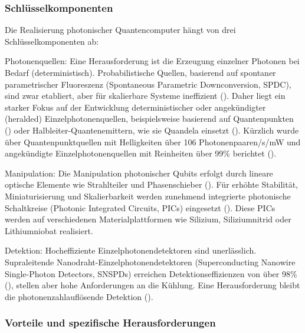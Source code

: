 \subsubsection{Schlüsselkomponenten}
Die Realisierung photonischer Quantencomputer hängt von drei Schlüsselkomponenten ab:
\par Photonenquellen: Eine Herausforderung ist die Erzeugung einzelner Photonen bei Bedarf (deterministisch). Probabilistische Quellen, basierend auf spontaner parametrischer Fluoreszenz (Spontaneous Parametric Downconversion, SPDC), sind zwar etabliert, aber für skalierbare Systeme ineffizient (\cite{slussarenkoPhotonicQuantumInformation2019}). Daher liegt ein starker Fokus auf der Entwicklung deterministischer oder angekündigter (heralded) Einzelphotonenquellen, beispielsweise basierend auf Quantenpunkten (\cite{LinearOpticsScalable}) oder Halbleiter-Quantenemittern, wie sie Quandela einsetzt (\cite{QuandelaAnnounces100000fold2025}). Kürzlich wurde über Quantenpunktquellen mit Helligkeiten über 106 Photonenpaaren/s/mW und angekündigte Einzelphotonenquellen mit Reinheiten über 99\% berichtet (\cite{LinearOpticsScalable}).
\par Manipulation: Die Manipulation photonischer Qubits erfolgt durch lineare optische Elemente wie Strahlteiler und Phasenschieber (\cite{slussarenkoPhotonicQuantumInformation2019}). Für erhöhte Stabilität, Miniaturisierung und Skalierbarkeit werden zunehmend integrierte photonische Schaltkreise (Photonic Integrated Circuits, PICs) eingesetzt (\cite{abughanemPhotonicQuantumComputers2024}). Diese PICs werden auf verschiedenen Materialplattformen wie Silizium, Siliziumnitrid oder Lithiumniobat realisiert.
\par Detektion: Hocheffiziente Einzelphotonendetektoren sind unerlässlich. Supraleitende Nanodraht-Einzelphotonendetektoren (Superconducting Nanowire Single-Photon Detectors, SNSPDs) erreichen Detektionseffizienzen von über 98\% (\cite{LinearOpticsScalable}), stellen aber hohe Anforderungen an die Kühlung. Eine Herausforderung bleibt die photonenzahlauflösende Detektion (\cite{slussarenkoPhotonicQuantumInformation2019}).

\subsubsection{Vorteile und spezifische Herausforderungen}

